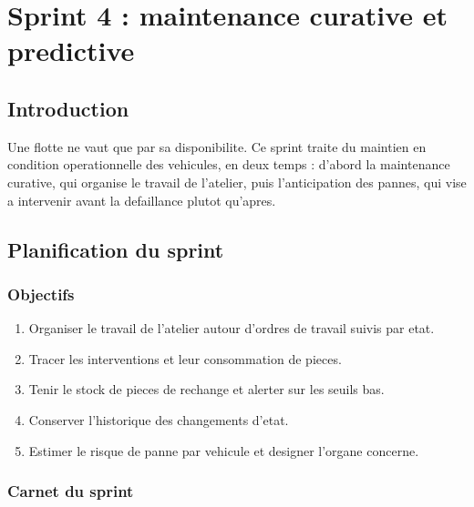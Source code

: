 \chapter{Sprint 4 : maintenance curative et predictive}
\label{chap:sprint4}

\section*{Introduction}

Une flotte ne vaut que par sa disponibilite. Ce sprint traite du maintien
en condition operationnelle des vehicules, en deux temps : d'abord la
maintenance curative, qui organise le travail de l'atelier, puis
l'anticipation des pannes, qui vise a intervenir avant la defaillance
plutot qu'apres.

\section{Planification du sprint}

\subsection{Objectifs}

\begin{enumerate}
  \item Organiser le travail de l'atelier autour d'ordres de travail
    suivis par etat.
  \item Tracer les interventions et leur consommation de pieces.
  \item Tenir le stock de pieces de rechange et alerter sur les seuils
    bas.
  \item Conserver l'historique des changements d'etat.
  \item Estimer le risque de panne par vehicule et designer l'organe
    concerne.
\end{enumerate}

\subsection{Carnet du sprint}


